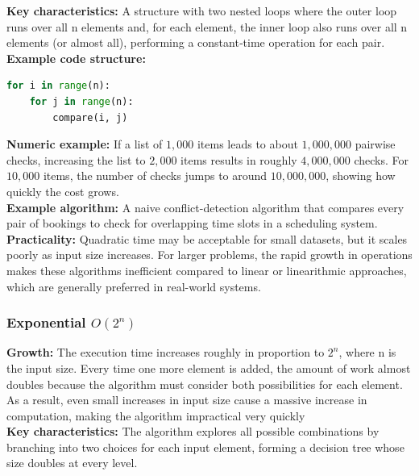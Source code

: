 \documentclass[12pt]{article}
\begin{document}
\noindent\textbf{Key characteristics:}
A structure with two nested loops where the outer loop runs over all n elements and, for each element, the inner loop also runs over all n elements (or almost all), performing a constant‑time operation for each pair.\\

\noindent\textbf{Example code structure:}
\begin{lstlisting}[language=Python]
for i in range(n):
    for j in range(n):
        compare(i, j)
\end{lstlisting}

\noindent\textbf{Numeric example:}
If a list of $1{,}000$ items leads to about $1{,}000{,}000$ pairwise checks, increasing the list to $2{,}000$ items results in roughly $4{,}000{,}000$ checks. For $10{,}000$ items, the number of checks jumps to around $10{,}000{,}000$, showing how quickly the cost grows.\\

\noindent\textbf{Example algorithm:}
A naive conflict-detection algorithm that compares every pair of bookings to check for overlapping time slots in a scheduling system.\\

\noindent\textbf{Practicality:}
Quadratic time may be acceptable for small datasets, but it scales poorly as input size increases. For larger problems, the rapid growth in operations makes these algorithms inefficient compared to linear or linearithmic approaches, which are
generally preferred in real-world systems.

\subsubsection{Exponential $O(2^n)$}

\noindent\textbf{Growth:}
The execution time increases roughly in proportion to $2^n$, where n is the input size. Every time one more element is added, the amount of work almost doubles because the algorithm must consider both possibilities for each element. As a result, even small increases in input size cause a massive increase in computation, making the algorithm impractical very quickly\\

\noindent\textbf{Key characteristics:}
The algorithm explores all possible combinations by branching into two choices
for each input element, forming a decision tree whose size doubles at every level.\\
\end{document}
